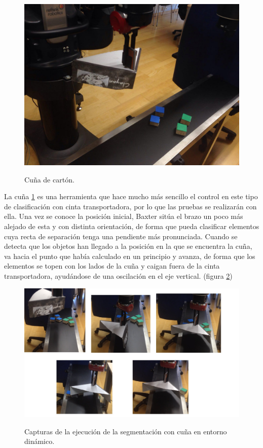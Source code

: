 \begin{enumerate}
	\begin{figure}[H]
		\centering %
		\label{cd:cuna}
		\includegraphics[scale=0.25]{imagenes/cunia.jpg}
		\caption{Cuña de cartón.}
	\end{figure}

	La cuña \ref{cd:cuna} es una herramienta que hace mucho más sencillo el control en este tipo de clasificación con cinta transportadora, por lo que las pruebas se realizarán con ella. Una vez se conoce la posición inicial, Baxter sitúa el brazo un poco más alejado de esta y con distinta orientación, de forma que pueda clasificar elementos cuya recta de separación tenga una pendiente más pronunciada. Cuando se detecta que los objetos han llegado a la posición en la que se encuentra la cuña, va hacia el punto que había calculado en un principio y avanza, de forma que los elementos se topen con los lados de la cuña y caigan fuera de la cinta transportadora, ayudándose de una oscilación en el eje vertical. (figura \ref{cd:cd})\\
	
	\begin{figure}[H]
		\centering %
		\label{cd:cd}
		\includegraphics[scale=0.18]{imagenes/cunadyn.jpg}
		\caption{Capturas de la ejecución de la segmentación con cuña en entorno dinámico.}
	\end{figure}

\end{enumerate}